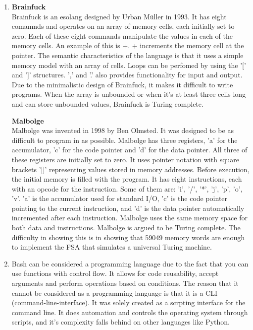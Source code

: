 \documentclass{article}
\begin{document}
\begin{enumerate}
    \item 
        \textbf{Brainfuck} \\
        Brainfuck is an esolang designed by Urban Müller in 1993. It has eight comamnds and operates on an array of memory cells, each initially set to zero. Each of these eight commands manipulate the values in each of the memory cells. An example of this is +. + increments the memory cell at the pointer. The semantic characteristics of the language is that it uses a simple memory model with an array of cells. Loops can be perfomed by using the '[' and ']' structures. ',' and '.' also provides functionality for input and output. Due to the minimalistic design of Brainfuck, it makes it difficult to write programs. When the array is unbounded or when it's at least three cells long and can store unbounded values, Brainfuck is Turing complete. \cite{brainfuck}

        \textbf{Malbolge} \\
        Malbolge was invented in 1998 by Ben Olmsted. It was designed to be as difficult to program in as possible. Malbolge has three registers, 'a' for the accumulator, 'c' for the code pointer and 'd' for the data pointer. All three of these registers are initially set to zero.
        It uses pointer notation with square brackets '[]' representing values stored in memory addresses. Before execution, the initial memory is filled with the program. It has eight instructions, each with an opcode for the instruction. Some of them are: 'i', '/', '*', 'j', 'p', 'o', 'v'.
        'a' is the accumulator used for standard I/O, 'c' is the code pointer pointing to the current instruction, and 'd' is the data pointer automatically incremented after each instruction. Malbolge uses the same memory space for both data and instructions. 
        Malbolge is argued to be Turing complete. The difficulty in showing this is in showing that 59049 memory words are enough to implement the FSA that simulates a universal Turing machine. \cite{eso_malbolge} \cite{wiki_malbolge}

    \item Bash can be considered a programming language due to the fact that you can use functions with control flow. It allows for code reusability, accept arguments and perform operations based on conditions. The reason that it cannot be considered as a programming language is that it is a CLI (command-line-interface).
    It was solely created as a scrpting interface for the command line. It does automation and controls the operating system through scripts, and it's complexity falls behind on other languages like Python. \cite{bash_codeacademy} \cite{bash_functions}
    

\end{enumerate}
\end{document}
